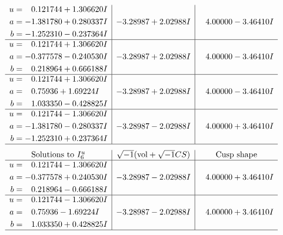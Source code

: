 \documentclass[1p]{elsarticle_modified}
\theoremstyle{definition}
\newcommand{\I}{\sqrt{-1}}
\begin{document}
$$\begin{array}{c|c|c}
\begin{aligned}
u &= \phantom{-}0.121744 + 1.306620 I \\
a &= -1.381780 + 0.280337 I \\
b &= -1.252310 - 0.237364 I\end{aligned}
 & -3.28987 + 2.02988 I & \phantom{-}4.00000 - 3.46410 I \\ \hline\begin{aligned}
u &= \phantom{-}0.121744 + 1.306620 I \\
a &= -0.377578 - 0.240530 I \\
b &= \phantom{-}0.218964 + 0.666188 I\end{aligned}
 & -3.28987 + 2.02988 I & \phantom{-}4.00000 - 3.46410 I \\ \hline\begin{aligned}
u &= \phantom{-}0.121744 + 1.306620 I \\
a &= \phantom{-}0.75936 + 1.69224 I \\
b &= \phantom{-}1.033350 - 0.428825 I\end{aligned}
 & -3.28987 + 2.02988 I & \phantom{-}4.00000 - 3.46410 I \\ \hline\begin{aligned}
u &= \phantom{-}0.121744 - 1.306620 I \\
a &= -1.381780 - 0.280337 I \\
b &= -1.252310 + 0.237364 I\end{aligned}
 & -3.28987 - 2.02988 I & \phantom{-}4.00000 + 3.46410 I\\
 \hline 
 \end{array}$$\newpage$$\begin{array}{c|c|c}  
\text{Solutions to }I^u_{6}& \I (\text{vol} + \sqrt{-1}CS) & \text{Cusp shape}\\
 \hline 
\begin{aligned}
u &= \phantom{-}0.121744 - 1.306620 I \\
a &= -0.377578 + 0.240530 I \\
b &= \phantom{-}0.218964 - 0.666188 I\end{aligned}
 & -3.28987 - 2.02988 I & \phantom{-}4.00000 + 3.46410 I \\ \hline\begin{aligned}
u &= \phantom{-}0.121744 - 1.306620 I \\
a &= \phantom{-}0.75936 - 1.69224 I \\
b &= \phantom{-}1.033350 + 0.428825 I\end{aligned}
 & -3.28987 - 2.02988 I & \phantom{-}4.00000 + 3.46410 I\\
 \hline 
 \end{array}$$\newpage\newpage\renewcommand{\arraystretch}{1}
\end{document}
